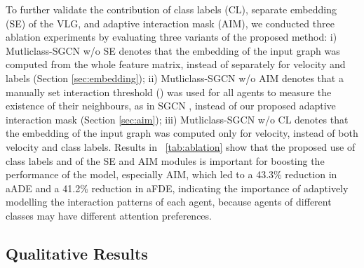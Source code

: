 \documentclass{article}
\begin{document}
\begin{table}[t]
\caption{Ablation study results.}
\label{tab:ablation}
\centering
{}
\end{table}


To further validate the contribution of class labels (CL), separate embedding (SE) of the VLG, and adaptive interaction mask (AIM), we conducted three ablation experiments by evaluating three variants of the proposed method: i) Mutliclass-SGCN w/o SE denotes that the embedding of the input graph was computed from the whole feature matrix, instead of separately for velocity and labels (Section \ref{sec:embedding}); ii) Mutliclass-SGCN w/o AIM denotes that a manually set interaction threshold () was used for all agents to measure the existence of their neighbours, as in SGCN \cite{shi2021sgcn}, instead of our proposed adaptive interaction mask (Section \ref{sec:aim}); iii) Mutliclass-SGCN w/o CL denotes that the embedding of the input graph was computed only for velocity, instead of both velocity and class labels. Results in \tablename~\ref{tab:ablation} show that the proposed use of class labels and of the SE and AIM modules is important for boosting the performance of the model, especially AIM, which led to a 43.3\% reduction in aADE and a 41.2\% reduction in aFDE, indicating the importance of adaptively modelling the interaction patterns of each agent,
because agents of different classes may have different attention preferences.



\subsection{Qualitative Results}
\end{document}
